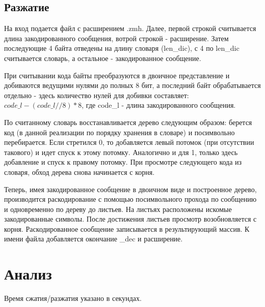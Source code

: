 \subsection{Разжатие}
На вход подается файл с расширением .zmh. Далее, первой строкой считывается длина закодированного сообщения, вотрой строкой - расширение.
Затем последующие 4 байта отведены на длину словаря (len\_dic), с 4 по len\_dic считывается словарь, а остальное - закодированное сообщение.
\par 
При считывании кода байты преобразуются в двоичное представление и добиваются ведущими нулями до полных 8 бит, а последний байт обрабатывается отдельно - здесь количество 
нулей для добивки составляет:  \(code\_l - (code\_l // 8) * 8\), где code\_l - длина закодированного сообщения.\par

По считанному словарь восстанавливается дерево следующим образом: берется код (в данной реализации по порядку хранения в словаре) и посимвольно перебирается. Если стретился 0, 
то добавляется левый потомок (при отсутствии такового) и идет спуск к этому потомку. Аналогично и для 1, только здесь добавление и спуск к правому потомку. При просмотре следующего кода из словаря, 
обход дерева снова начинается с корня. \par 

Теперь, имея закодированное сообщение в двоичном виде и построенное дерево, производится раскодирование с помощью 
посимвольного прохода по сообщению и одновременно по дереву до листьев. На листьях расположены искомые закодированные символы. После достижения 
листьев просмотр возобновляется с корня. Раскодированное сообщение записывается в результирующий массив.
К имени файла добавляется окончание \_dec и расширение. 



\section{Анализ}
Время сжатия/разжатия указано в секундах. \par

\bigskip




